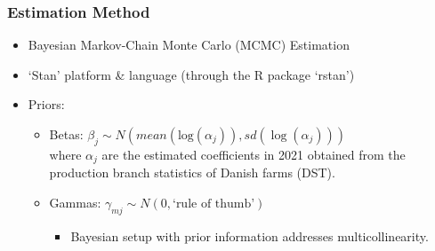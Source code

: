 \documentclass[t,24pt,aspectratio=169]{beamer}
\begin{document}
\begin{frame}[hvid]
\frametitle{\vspace{-3ex}Estimation Method}
\begin{itemize}
    \item Bayesian Markov-Chain Monte Carlo (MCMC) Estimation
    \item ‘Stan’ platform \& language
        (through the R package ‘rstan’)
    \item Priors:
    \begin{itemize}
        \item Betas: $\beta_j \sim N \left( mean( \text{log}( \alpha_{j} ) ), sd( \log ( \alpha_{j} ) ) \right)$ \\ 
        \vspace{1ex}
        where $\alpha_j$ are the estimated coefficients in 2021 obtained from the production branch statistics of Danish farms (DST).
        \vspace{2ex}
        \item Gammas: $\gamma_{mj} \sim N( 0, \text{`rule of thumb'} )$ \\
        \vspace{1ex}
        \vspace{2ex}
        \begin{itemize}
            \item[\fontsize{12pt}{14pt}\selectfont $\Rightarrow$] \fontsize{11pt}{14pt}\selectfont Bayesian setup with prior information addresses multicollinearity.
        \end{itemize}
    \end{itemize}
\end{itemize}
\end{frame}
\end{document}
